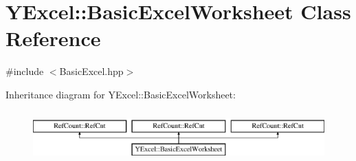 \hypertarget{class_y_excel_1_1_basic_excel_worksheet}{}\section{Y\+Excel\+:\+:Basic\+Excel\+Worksheet Class Reference}
\label{class_y_excel_1_1_basic_excel_worksheet}


{\ttfamily \#include $<$Basic\+Excel.\+hpp$>$}

Inheritance diagram for Y\+Excel\+:\+:Basic\+Excel\+Worksheet\+:\begin{figure}[H]
\begin{center}
\leavevmode
\includegraphics[height=1.996435cm]{class_y_excel_1_1_basic_excel_worksheet}
\end{center}
\end{figure}
